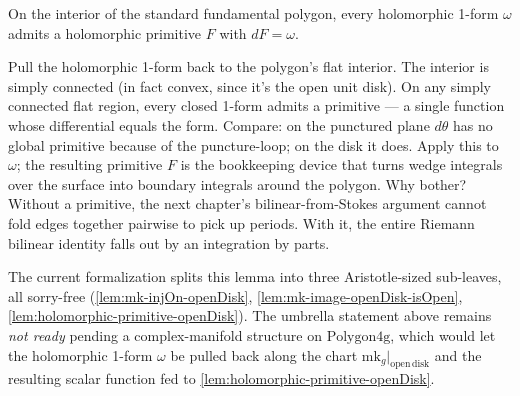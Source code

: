 \begin{lemma}
\label{lem:primitive-on-polygon}
On the interior of the standard fundamental polygon, every
holomorphic 1-form \(\omega\) admits a holomorphic primitive
\(F\) with \(dF=\omega\).
\notready
\end{lemma}

\begin{layman}
Pull the holomorphic 1-form back to the polygon's flat interior.
The interior is simply connected (in fact convex, since it's the
open unit disk). On any simply connected flat region, every
closed 1-form admits a primitive — a single function whose
differential equals the form. Compare: on the punctured plane
\(d\theta\) has no global primitive because of the puncture-loop;
on the disk it does. Apply this to \(\omega\); the resulting
primitive \(F\) is the bookkeeping device that turns wedge
integrals over the surface into boundary integrals around the
polygon. Why bother? Without a primitive, the next chapter's
bilinear-from-Stokes argument cannot fold edges together pairwise
to pick up periods. With it, the entire Riemann bilinear
identity falls out by an integration by parts.
\end{layman}

\begin{formalizationnote}
The current formalization splits this lemma into three Aristotle-sized
sub-leaves, all sorry-free
(\ref{lem:mk-injOn-openDisk}, \ref{lem:mk-image-openDisk-isOpen},
\ref{lem:holomorphic-primitive-openDisk}). The umbrella statement
above remains \emph{not ready} pending a complex-manifold structure on
\(\mathrm{Polygon4g}\), which would let the holomorphic 1-form
\(\omega\) be pulled back along the chart
\(\mathrm{mk}_g|_{\mathrm{open\,disk}}\) and the resulting scalar
function fed to
\ref{lem:holomorphic-primitive-openDisk}.
\end{formalizationnote}

